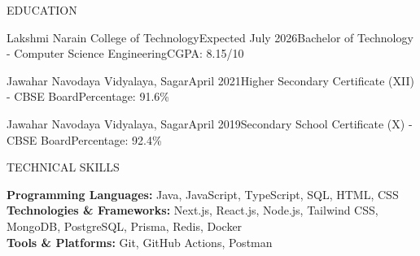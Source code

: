 \documentclass{resume}
\begin{document}
\begin{rSection}{EDUCATION}

\begin{rEducation}{Lakshmi Narain College of Technology}{Expected July 2026}{Bachelor of Technology - Computer Science Engineering}{CGPA: 8.15/10}
\end{rEducation}

\begin{rEducation}{Jawahar Navodaya Vidyalaya, Sagar}{April 2021}{Higher Secondary Certificate (XII) - CBSE Board}{Percentage: 91.6\%}
\end{rEducation}

\begin{rEducation}{Jawahar Navodaya Vidyalaya, Sagar}{April 2019}{Secondary School Certificate (X) - CBSE Board}{Percentage: 92.4\%}
\end{rEducation}

\end{rSection}

\begin{rSection}{TECHNICAL SKILLS}

\textbf{Programming Languages:} Java, JavaScript, TypeScript, SQL, HTML, CSS \\[2pt]
\textbf{Technologies \& Frameworks:} Next.js, React.js, Node.js, Tailwind CSS, MongoDB, PostgreSQL, Prisma, Redis, Docker \\[2pt]
\textbf{Tools \& Platforms:} Git, GitHub Actions, Postman

\end{rSection}
\end{document}
